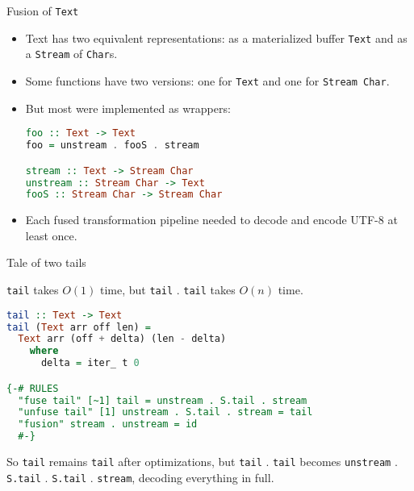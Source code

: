 \documentclass[handout]{beamer}
\begin{document}
\begin{frame}[fragile]{Fusion of {\tt Text}}

\begin{itemize}[<+->]
\item Text has two equivalent representations:
  as a materialized buffer {\tt Text} and as a {\tt Stream} of {\tt Char}s.
\item Some functions have two versions: one for {\tt Text}
  and one for {\tt Stream Char}.
\item But most were implemented as wrappers:

\begin{lstlisting}[language=Haskell]
foo :: Text -> Text
foo = unstream . fooS . stream

stream :: Text -> Stream Char
unstream :: Stream Char -> Text
fooS :: Stream Char -> Stream Char
\end{lstlisting}

\item Each fused transformation pipeline needed to decode and encode UTF-8 at least once.
\end{itemize}

\end{frame}

\begin{frame}[fragile]{Tale of two tails}

{\tt tail} takes $O(1)$ time, but {\tt tail} . {\tt tail} takes $O(n)$ time.

\pause

\begin{lstlisting}[language=Haskell]
tail :: Text -> Text
tail (Text arr off len) =
  Text arr (off + delta) (len - delta)
    where
      delta = iter_ t 0

{-# RULES
  "fuse tail" [~1] tail = unstream . S.tail . stream
  "unfuse tail" [1] unstream . S.tail . stream = tail
  "fusion" stream . unstream = id
  #-}
\end{lstlisting}

\pause

So {\tt tail} remains {\tt tail} after optimizations,
but {\tt tail} . {\tt tail} becomes
{\tt unstream} . {\tt S.tail} . {\tt S.tail} . {\tt stream},
decoding everything in full.

\end{frame}
\end{document}
